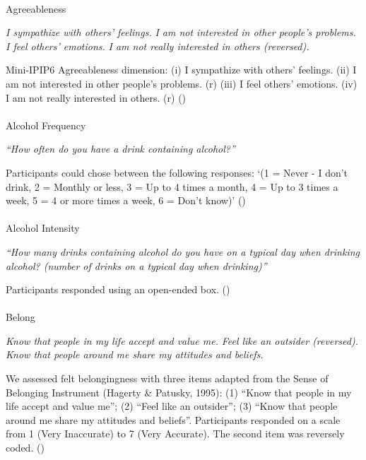 \documentclass[
  single column]{article}
\makeatletter
\let\oldparagraph\paragraph
\renewcommand{\paragraph}{
    \@ifstar
      \xxxParagraphStar
      \xxxParagraphNoStar
  }
\newcommand{\xxxParagraphStar}[1]{\oldparagraph*{#1}\mbox{}}
\newcommand{\xxxParagraphNoStar}[1]{\oldparagraph{#1}\mbox{}}
\makeatother
\begin{document}
\paragraph{Agreeableness}\label{agreeableness}

\emph{I sympathize with others' feelings.} \emph{I am not interested in
other people's problems.} \emph{I feel others' emotions.} \emph{I am not
really interested in others (reversed).}

Mini-IPIP6 Agreeableness dimension: (i) I sympathize with others'
feelings. (ii) I am not interested in other people's problems. (r) (iii)
I feel others' emotions. (iv) I am not really interested in others. (r)
()

\paragraph{Alcohol Frequency}\label{alcohol-frequency}

\emph{``How often do you have a drink containing alcohol?''}

Participants could chose between the following responses: `(1 = Never -
I don't drink, 2 = Monthly or less, 3 = Up to 4 times a month, 4 = Up to
3 times a week, 5 = 4 or more times a week, 6 = Don't know)'
()

\paragraph{Alcohol Intensity}\label{alcohol-intensity}

\emph{``How many drinks containing alcohol do you have on a typical day
when drinking alcohol? (number of drinks on a typical day when
drinking)''}

Participants responded using an open-ended box.
()

\paragraph{Belong}\label{belong}

\emph{Know that people in my life accept and value me.} \emph{Feel like
an outsider (reversed).} \emph{Know that people around me share my
attitudes and beliefs.}

We assessed felt belongingness with three items adapted from the Sense
of Belonging Instrument (Hagerty \& Patusky, 1995): (1) ``Know that
people in my life accept and value me''; (2) ``Feel like an outsider'';
(3) ``Know that people around me share my attitudes and beliefs''.
Participants responded on a scale from 1 (Very Inaccurate) to 7 (Very
Accurate). The second item was reversely coded.
()
\end{document}
